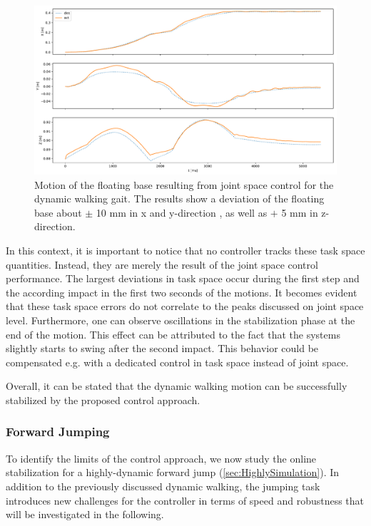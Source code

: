 \begin{figure}
\centering	
\includegraphics[width=.85\textwidth]{fig/walkDynamic/pybullet/pybulletBase}
\caption[Motion of the floating base for dynamic walking]{Motion of the floating base resulting from joint space control for the dynamic walking gait. The results show a deviation of the floating base about $\pm$ 10 mm in x and y-direction , as well as $+$ 5 mm in z-direction.}
\label{fig:walkDynamic_pybulletBase}
\end{figure}

In this context, it is important to notice that no controller tracks these task space quantities. Instead, they are merely the result of the joint space control performance. The largest deviations in task space occur during the first step and the according impact in the first two seconds of the motions. It becomes evident that these task space errors do not correlate to the peaks discussed on joint space level. Furthermore, one can observe oscillations in the stabilization phase at the end of the motion. This effect can be attributed to the fact that the systems slightly starts to swing after the second impact. This behavior could be compensated e.g. with a dedicated control in task space instead of joint space. 

Overall, it can be stated that the dynamic walking motion can be successfully stabilized by the proposed control approach. 

\subsubsection{Forward Jumping}
To identify the limits of the control approach, we now study the online stabilization for a highly-dynamic forward jump (\cref{sec:HighlySimulation}). In addition to the previously discussed dynamic walking, the jumping task introduces new challenges for the controller in terms of speed and robustness that will be investigated in the following.  


